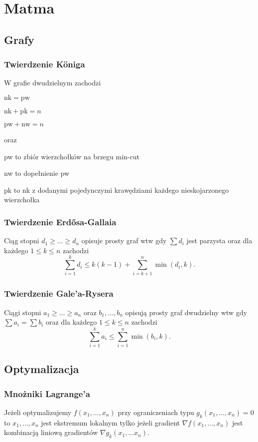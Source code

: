 \section{Matma}

\subsection{Grafy}
\subsubsection{Twierdzenie K\"oniga}
W grafie dwudzielnym zachodzi
\begin{compactitem}
  \item $\mathrm{nk} = \mathrm{pw}$
  \item $\mathrm{nk} + \mathrm{pk} = n$
  \item $\mathrm{pw} + \mathrm{nw} = n$
\end{compactitem}
oraz
\begin{compactitem}
  \item pw to zbiór wierzchołków na brzegu min-cut
  \item nw to dopełnienie pw
  \item pk to nk z dodanymi pojedynczymi krawędziami każdego nieskojarzonego wierzchołka
\end{compactitem}

\subsubsection{Twierdzenie Erd\H{o}sa-Gallaia}
Ciąg stopni $d_1 \geq \dots \geq d_n$ opisuje prosty graf wtw gdy
$\sum d_i$ jest parzysta oraz dla każdego $1 \leq k \leq n$ zachodzi
\[
  \sum_{i=1}^{k} d_i \leq k(k - 1) + \sum_{i=k + 1}^{n} \min(d_i, k).
\]

\subsubsection{Twierdzenie Gale'a-Rysera}
Ciągi stopni $a_1 \geq \dots \geq a_n$ oraz $b_1, \dots, b_n$ opisują
prosty graf dwudzielny wtw gdy $\sum a_i = \sum b_i$ oraz dla każdego $1 \leq k \leq n$ zachodzi
\[
  \sum_{i=1}^{k} a_i \leq \sum_{i=1}^{n} \min(b_i, k).
\]

\subsection{Optymalizacja}
\subsubsection{Mnożniki Lagrange'a}
Jeżeli optymalizujemy $f(x_1, \dots, x_n)$ przy ograniczeniach typu $g_k(x_1, \dots, x_n) = 0$ to
$x_1, \dots, x_n$ jest ekstremum lokalnym tylko jeżeli gradient $\nabla f(x_1, \dots, x_n)$ jest
kombinacją liniową gradientów $\nabla g_k(x_1, \dots x_n)$.
